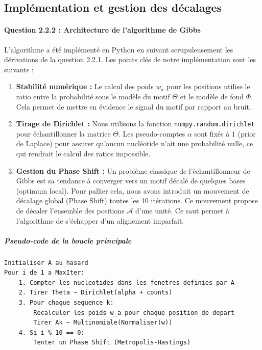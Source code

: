 \subsection{Implémentation et gestion des décalages}
\paragraph{Question 2.2.2 : Architecture de l'algorithme de Gibbs}

L'algorithme a été implémenté en Python en suivant scrupuleusement les 
dérivations de la question 2.2.1. Les points clés de notre implémentation 
sont les suivants :

\begin{enumerate}
    \item \textbf{Stabilité numérique :} Le calcul des poids $w_a$ pour les positions utilise le ratio entre la probabilité sous le modèle du motif $\Theta$ et le modèle de fond $\Phi$. Cela permet de mettre en évidence le signal du motif par rapport au bruit.
    \item \textbf{Tirage de Dirichlet :} Nous utilisons la fonction \texttt{numpy.random.dirichlet} pour échantillonner la matrice $\Theta$. Les pseudo-comptes $\alpha$ sont fixés à $1$ (prior de Laplace) pour assurer qu'aucun nucléotide n'ait une probabilité nulle, ce qui rendrait le calcul des ratios impossible.
    \item \textbf{Gestion du Phase Shift :} Un problème classique de l'échantillonneur de Gibbs est sa tendance à converger vers un motif décalé de quelques bases (optimum local). Pour pallier cela, nous avons introduit un mouvement de décalage global (Phase Shift) toutes les 10 itérations. Ce mouvement propose de décaler l'ensemble des positions $\mathcal{A}$ d'une unité. Ce saut permet à l'algorithme de s'échapper d'un alignement imparfait.
\end{enumerate}

\subparagraph{Pseudo-code de la boucle principale}
\begin{lstlisting}
Initialiser A au hasard
Pour i de 1 a MaxIter:
    1. Compter les nucleotides dans les fenetres definies par A
    2. Tirer Theta ~ Dirichlet(alpha + counts)
    3. Pour chaque sequence k:
        Recalculer les poids w_a pour chaque position de depart
        Tirer Ak ~ Multinomiale(Normaliser(w))
    4. Si i % 10 == 0: 
        Tenter un Phase Shift (Metropolis-Hastings)
\end{lstlisting}